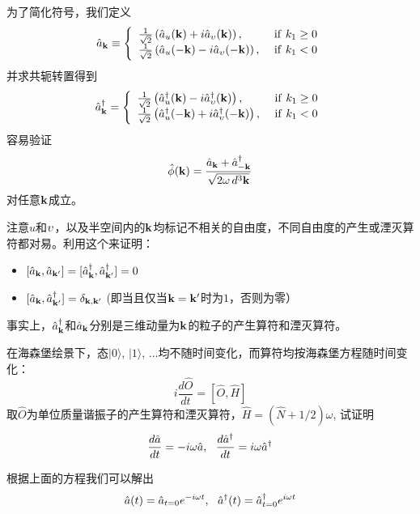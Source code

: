 \documentclass[CJK]{beamer}
\begin{document}
\begin{frame}
\bch
为了简化符号，我们定义
\begin{equation}
{\hat{a}}_{{\mathbf{k}}} \equiv \left\{ \begin{array}{ll}
\frac{1}{\sqrt{2}}\left({\hat{a}}_u({\mathbf{k}}) + i {\hat{a}}_{\upsilon}({\mathbf{k}})\right), & \ \mathrm{if\ }k_1\ge 0 \\
\frac{1}{\sqrt{2}}\left({\hat{a}}_u(-{\mathbf{k}}) - i {\hat{a}}_{\upsilon}(-{\mathbf{k}})\right), & \ \mathrm{if\ }k_1<0 
\end{array}\right. \nonumber
\end{equation}
并求共轭转置得到
\begin{equation}
{\hat{a}^\dagger}_{{\mathbf{k}}} = \left\{ \begin{array}{ll}
\frac{1}{\sqrt{2}}\left({\hat{a}^\dagger}_u({\mathbf{k}}) - i {\hat{a}^\dagger}_{\upsilon}({\mathbf{k}})\right), & \ \mathrm{if\ }k_1\ge 0 \\
\frac{1}{\sqrt{2}}\left({\hat{a}^\dagger}_u(-{\mathbf{k}}) + i {\hat{a}^\dagger}_{\upsilon}(-{\mathbf{k}})\right), & \ \mathrm{if\ }k_1<0 
\end{array}\right. \nonumber
\end{equation}
容易验证
$${\hat{\phi}}({\mathbf{k}}) = \frac{{\hat{a}}_{{\mathbf{k}}}+{\hat{a}^\dagger}_{-{\mathbf{k}}}}{\sqrt{2\omega\, d^3{\mathbf{k}}}}$$
对任意${\mathbf{k}}$成立。
\ech
\end{frame}

\begin{frame}
\bch
注意$u$和$\upsilon$，以及半空间内的${\mathbf{k}}$均标记不相关的自由度，不同自由度的产生或湮灭算符都对易。利用这个来证明：
\begin{itemize}
\item{$[{\hat{a}}_{{\mathbf{k}}}, {\hat{a}}_{{\mathbf{k}}'}]=[{\hat{a}^\dagger}_{{\mathbf{k}}},{\hat{a}^\dagger}_{{\mathbf{k}}'}] = 0$}
\item{$[{\hat{a}}_{{\mathbf{k}}},{\hat{a}^\dagger}_{{\mathbf{k}}'}] = \delta_{{\mathbf{k}},{\mathbf{k}}'}$ (即当且仅当${\mathbf{k}}={\mathbf{k}}'$时为$1$，否则为零）}
\end{itemize}


事实上，${\hat{a}^\dagger}_{{\mathbf{k}}}$和${\hat{a}}_{{\mathbf{k}}}$分别是三维动量为${\mathbf{k}}$的粒子的产生算符和湮灭算符。
\ech
\end{frame}

\begin{frame}
\bch
在海森堡绘景下，态$|0\rangle$, $|1\rangle$, $\ldots$均不随时间变化，而算符均按海森堡方程随时间变化：
$$ i \frac{d \hat{O}}{dt} =  [\hat{O}, \hat{H}] $$
取$\hat{O}$为单位质量谐振子的产生算符和湮灭算符，$\hat{H} = (\hat{N}+1/2)\omega$, 试证明
$$\frac{d {\hat{a}}}{dt} = -i\omega {\hat{a}}, \ \  \frac{d {\hat{a}^\dagger}}{dt} =  i\omega {\hat{a}^\dagger}$$

\skipline
根据上面的方程我们可以解出
$${\hat{a}}(t) = {\hat{a}}_{t=0} e^{-i\omega t}, \ \ {\hat{a}^\dagger}(t) = {\hat{a}^\dagger}_{t=0} e^{i\omega t}$$
\ech
\end{frame}
\end{document}

